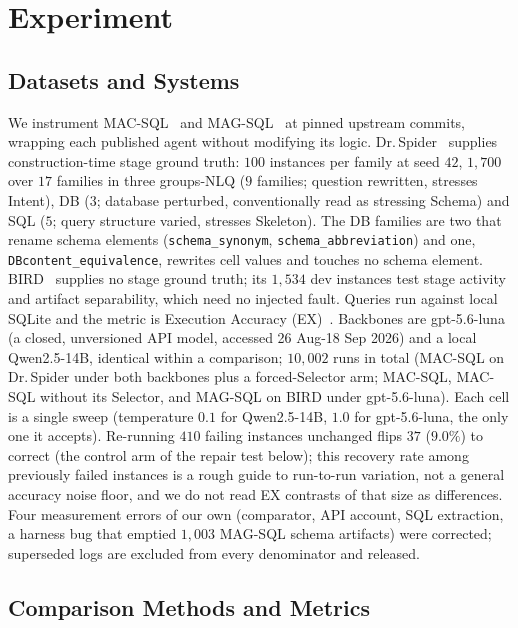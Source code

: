 \documentclass{llncs}
\begin{document}
\section{Experiment}
\label{sec:experiment}


\subsection{Datasets and Systems}
\label{sec:setup}

We instrument MAC-SQL~\cite{wang_mac-sql_2025} and
MAG-SQL~\cite{xie_mag-sql_2024} at pinned upstream commits, wrapping each
published agent without modifying its logic.
Dr.\,Spider~\cite{chang_drspider_2023} supplies construction-time stage ground
truth: $100$ instances per family at seed $42$, $1{,}700$ over $17$ families in
three groups-NLQ ($9$ families; question rewritten, stresses Intent), DB
($3$; database perturbed, conventionally read as stressing Schema) and SQL
($5$; query structure varied, stresses Skeleton). The DB families are two that rename
schema elements (\texttt{schema\_synonym}, \texttt{schema\_abbreviation})
and one, \texttt{DBcontent\_equivalence}, rewrites cell values and touches
no schema element. BIRD~\cite{li_bird_2023} supplies no stage ground truth; its
$1{,}534$ dev instances test stage activity and artifact separability, which
need no injected fault. Queries run against local SQLite and the metric is
Execution Accuracy (EX)~\cite{yu_spider_2018}. Backbones are gpt-5.6-luna (a
closed, unversioned API model, accessed 26 Aug-18 Sep 2026) and a local
Qwen2.5-14B, identical within a comparison; $10{,}002$ runs in total
(MAC-SQL on Dr.\,Spider under both backbones plus a forced-Selector arm;
MAC-SQL, MAC-SQL without its Selector, and MAG-SQL on BIRD under
gpt-5.6-luna). Each cell is a single sweep (temperature $0.1$ for
Qwen2.5-14B, $1.0$ for gpt-5.6-luna, the only one it accepts). Re-running $410$
failing instances unchanged flips $37$ ($9.0\%$) to correct (the control arm
of the repair test below); this recovery rate among previously failed
instances is a rough guide to run-to-run variation, not a general accuracy
noise floor, and we do not read EX contrasts of that size as differences.
Four measurement errors of our own (comparator, API account, SQL extraction,
a harness bug that emptied $1{,}003$ MAG-SQL schema artifacts) were
corrected; superseded logs are excluded from every denominator and released.

\subsection{Comparison Methods and Metrics}
\label{sec:comparison}\label{sec:metrics}
\end{document}
